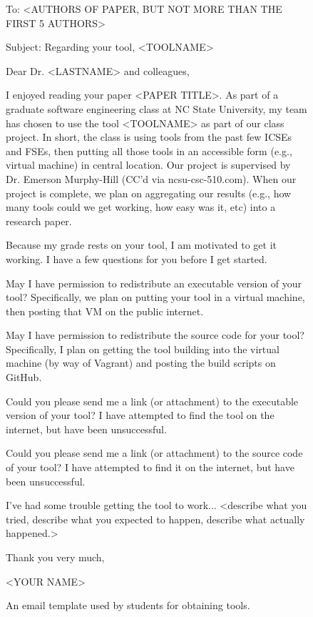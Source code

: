 \documentclass{sig-alternate-05-2015}
\begin{document}
\begin{figure}[t]

\noindent
To: <AUTHORS OF PAPER, BUT NOT MORE THAN THE FIRST 5 AUTHORS>

\noindent
Subject: Regarding your tool, <TOOLNAME>

\noindent
Dear Dr. <LASTNAME> and colleagues,

I enjoyed reading your paper <PAPER TITLE>. As part of a graduate software engineering 
class at NC State University, my team has chosen to use the tool <TOOLNAME> as part of our 
class project. In short, the class is using tools from the past few ICSEs and FSEs, then putting 
all those tools in an accessible form (e.g., virtual machine) in central location. Our project is 
supervised by Dr. Emerson Murphy-Hill (CC'd via ncsu-csc-510\@googlegroups.com). When our 
project is complete, we plan on aggregating our results (e.g., how many tools could we get 
working, how easy was it, etc) into a research paper.

Because my grade rests on your tool, I am motivated to get it working. I have a few questions 
for you before I get started.

May I have permission to redistribute an executable version of your tool? Specifically, we plan 
on putting your tool in a virtual machine, then posting that VM on the public internet.

May I have permission to redistribute the source code for your tool? Specifically, I plan on 
getting the tool building into the virtual machine (by way of Vagrant) and posting the build scripts 
on GitHub.

Could you please send me a link (or attachment) to the executable version of your tool? I have 
attempted to find the tool on the internet, but have been unsuccessful.

Could you please send me a link (or attachment) to the source code of your tool? I have 
attempted to find it on the internet, but have been unsuccessful.

I've had some trouble getting the tool to work... <describe what you tried, describe what you 
expected to happen, describe what actually happened.>

Thank you very much,

<YOUR NAME>

\caption{An email template used by students for obtaining tools.}\label{fig:email}

\end{figure}
\end{document}
